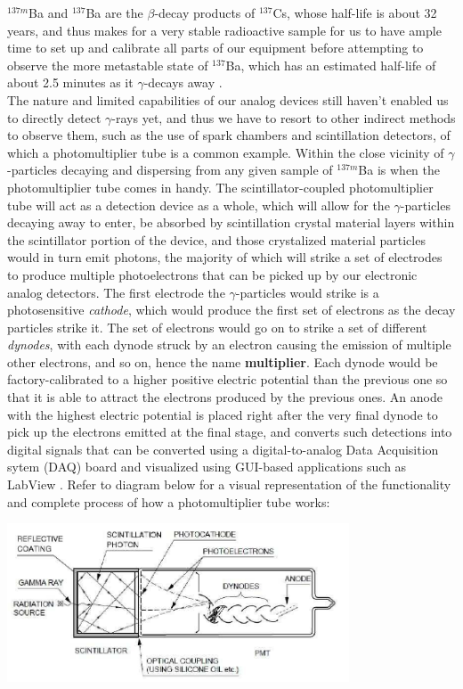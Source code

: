 \documentclass[10pt,letterpaper,onecolumn]{article}
\begin{document}
$^{137m}$Ba and $^{137}$Ba are the $\beta$-decay products of $^{137}$Cs, whose half-life is about 32 years, and thus makes for a very stable radioactive sample for us to have ample time to set up and calibrate all parts of our equipment before attempting to observe the more metastable state of $^{137}$Ba, which has an estimated half-life of about 2.5 minutes as it $\gamma$-decays away \cite{cassy}. \\
The nature and limited capabilities of our analog devices still haven't enabled us to directly detect $\gamma$-rays yet, and thus we have to resort to other indirect methods to observe them, such as the use of spark chambers and scintillation detectors, of which a photomultiplier tube is a common example. Within the close vicinity of $\gamma$-particles decaying and dispersing from any given sample of $^{137m}$Ba is when the photomultiplier tube comes in handy. The scintillator-coupled photomultiplier tube will act as a detection device as a whole, which will allow for the $\gamma$-particles decaying away to enter, be absorbed by scintillation crystal material layers within the scintillator portion of the device, and those crystalized material particles would in turn emit photons, the majority of which will strike a set of electrodes to produce multiple photoelectrons that can be picked up by our electronic analog detectors. The first electrode the $\gamma$-particles would strike is a photosensitive {\it cathode}, which would produce the first set of electrons as the decay particles strike it. The set of electrons would go on to strike a set of different {\it dynodes}, with each dynode struck by an electron causing the emission of multiple other electrons, and so on, hence the name {\bf multiplier}. Each dynode would be factory-calibrated to a higher positive electric potential than the previous one so that it is able to attract the electrons produced by the previous ones. An anode with the highest electric potential is placed right after the very final dynode to pick up the electrons emitted at the final stage, and converts such detections into digital signals that can be converted using a digital-to-analog Data Acquisition sytem (DAQ) board and visualized using GUI-based applications such as LabView \cite{pmt}. Refer to diagram below for a visual representation of the functionality and complete process of how a photomultiplier tube works:


 \begin{center}
 \includegraphics*[width=4in]{pmt-new.png}
 \label{fig:pmt}
 \end{center}
\end{document}

